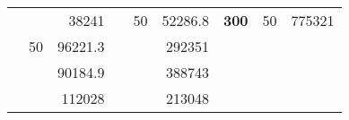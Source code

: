 \begin{table}[H]
\begin{tabular}{|ccrccrccc}
\rowcolor[HTML]{DDFDFF} 
\multicolumn{1}{|c|}{\cellcolor[HTML]{FFFFC7}}                                & \multicolumn{1}{c|}{\cellcolor[HTML]{DDFDFF}}                      & \multicolumn{1}{r|}{\cellcolor[HTML]{DAE8FC}38241}     & \multicolumn{1}{c|}{\cellcolor[HTML]{FFFFC7}}                                & \multicolumn{1}{c|}{\multirow{-10}{*}{\cellcolor[HTML]{DDFDFF}50}}  & \multicolumn{1}{r|}{\cellcolor[HTML]{DDFDFF}52286.8}   & \multicolumn{1}{c|}{\multirow{-19}{*}{\cellcolor[HTML]{FFFFC7}\textbf{300}}} & \multicolumn{1}{c|}{\multirow{-10}{*}{\cellcolor[HTML]{DDFDFF}50}} & \multicolumn{1}{r|}{\cellcolor[HTML]{DDFDFF}775321}    \\ \cline{3-3} \cline{5-9} 
\multicolumn{1}{|c|}{\cellcolor[HTML]{FFFFC7}}                                & \multicolumn{1}{c|}{\multirow{-10}{*}{\cellcolor[HTML]{DDFDFF}50}} & \multicolumn{1}{r|}{\cellcolor[HTML]{DDFDFF}96221.3}   & \multicolumn{1}{c|}{\cellcolor[HTML]{FFFFC7}}                                & \multicolumn{1}{c|}{\cellcolor[HTML]{DAE8FC}}                       & \multicolumn{1}{r|}{\cellcolor[HTML]{DAE8FC}292351}    &                                                                              &                                                                    &                                                        \\ \cline{2-3} \cline{6-6}
\multicolumn{1}{|c|}{\cellcolor[HTML]{FFFFC7}}                                & \multicolumn{1}{c|}{\cellcolor[HTML]{DAE8FC}}                      & \multicolumn{1}{r|}{\cellcolor[HTML]{DAE8FC}90184.9}   & \multicolumn{1}{c|}{\cellcolor[HTML]{FFFFC7}}                                & \multicolumn{1}{c|}{\cellcolor[HTML]{DAE8FC}}                       & \multicolumn{1}{r|}{\cellcolor[HTML]{DDFDFF}388743}    &                                                                              &                                                                    &                                                        \\ \cline{3-3} \cline{6-6}
\multicolumn{1}{|c|}{\cellcolor[HTML]{FFFFC7}}                                & \multicolumn{1}{c|}{\cellcolor[HTML]{DAE8FC}}                      & \multicolumn{1}{r|}{\cellcolor[HTML]{DDFDFF}112028}    & \multicolumn{1}{c|}{\cellcolor[HTML]{FFFFC7}}                                & \multicolumn{1}{c|}{\cellcolor[HTML]{DAE8FC}}                       & \multicolumn{1}{r|}{\cellcolor[HTML]{DAE8FC}213048}    &                                                                              &                                                                    &                                                        \\ \cline{3-3} \cline{6-6}

\end{tabular}
\end{table}
